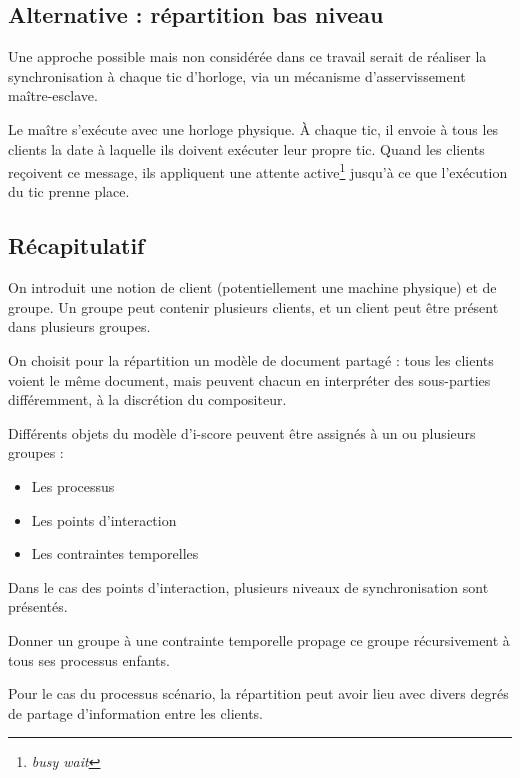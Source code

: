 \documentclass{article}
\begin{document}
\subsection{Alternative : répartition bas niveau}
Une approche possible mais non considérée dans ce travail serait de réaliser la synchronisation à chaque tic d'horloge, via un mécanisme d'asservissement maître-esclave.

Le maître s'exécute avec une horloge physique.
À chaque tic, il envoie à tous les clients la date à laquelle ils doivent exécuter leur propre tic. 
Quand les clients reçoivent ce message, ils appliquent une attente active\footnote{\textit{busy wait}} jusqu'à ce que l'exécution du tic prenne place.
\subsection{Récapitulatif}
On introduit une notion de client (potentiellement une machine physique) et de groupe.
Un groupe peut contenir plusieurs clients, et un client peut être présent dans plusieurs groupes.

On choisit pour la répartition un modèle de document partagé : tous les clients voient le même document, mais peuvent chacun en interpréter des sous-parties différemment, à la discrétion du compositeur.

Différents objets du modèle d'i-score peuvent être assignés à un ou plusieurs groupes : 

\begin{itemize}
	\item Les processus
	\item Les points d'interaction
	\item Les contraintes temporelles
\end{itemize}

Dans le cas des points d'interaction, plusieurs niveaux de synchronisation sont présentés.

Donner un groupe à une contrainte temporelle propage ce groupe récursivement à tous ses processus enfants.

Pour le cas du processus scénario, la répartition peut avoir lieu avec divers degrés de partage d'information entre les clients.

\end{document}
